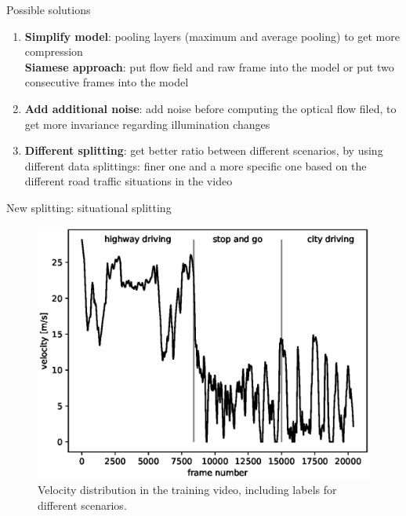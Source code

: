 \begin{frame}{Possible solutions}
\begin{enumerate}
\item \textbf{Simplify model}: pooling layers (maximum and average pooling) to get more compression\\
\textbf{Siamese approach}: put flow field and raw frame into the model or put two consecutive frames into the model
\item \textbf{Add additional noise}: add noise before computing the optical flow filed, to get more invariance regarding illumination changes
\item \textbf{Different splitting}: get better ratio between different scenarios, by using different data splittings:
finer one and a more specific one based on the different road traffic situations in the video
\end{enumerate}
\end{frame}

\begin{frame}{New splitting: situational splitting}
\begin{figure}
\centering
\includegraphics[scale=0.5]{./imgs/plot_speed_time_new_splitting.eps}
\caption{Velocity distribution in the training video, including labels for different scenarios.}
\end{figure}
\end{frame}

